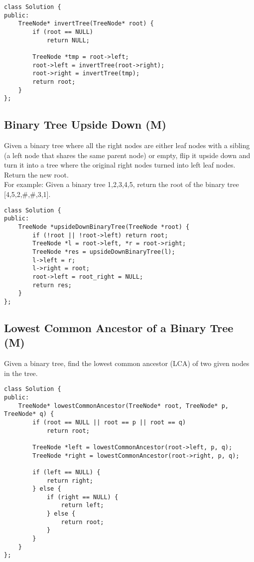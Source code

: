 \begin{lstlisting}
class Solution {
public:
    TreeNode* invertTree(TreeNode* root) {
        if (root == NULL)
            return NULL;
            
        TreeNode *tmp = root->left;
        root->left = invertTree(root->right);
        root->right = invertTree(tmp);
        return root;
    }
};
\end{lstlisting}


\subsection{Binary Tree Upside Down (M)}
Given a binary tree where all the right nodes are either leaf nodes with a sibling (a left node that shares the same parent node) or empty, flip it upside down and turn it into a tree where the original right nodes turned into left leaf nodes. Return the new root.\\

For example:
Given a binary tree {1,2,3,4,5}, return the root of the binary tree [4,5,2,\#,\#,3,1]. \\

\begin{lstlisting}
class Solution {
public:
    TreeNode *upsideDownBinaryTree(TreeNode *root) {
        if (!root || !root->left) return root;
        TreeNode *l = root->left, *r = root->right;
        TreeNode *res = upsideDownBinaryTree(l);
        l->left = r;
        l->right = root;
        root->left = root_right = NULL;
        return res;
    }
};
\end{lstlisting}


\subsection{Lowest Common Ancestor of a Binary Tree (M)}
Given a binary tree, find the lowest common ancestor (LCA) of two given nodes in the tree. \\

\begin{lstlisting}
class Solution {
public:
    TreeNode* lowestCommonAncestor(TreeNode* root, TreeNode* p, TreeNode* q) {
        if (root == NULL || root == p || root == q)
            return root;
        
        TreeNode *left = lowestCommonAncestor(root->left, p, q);
        TreeNode *right = lowestCommonAncestor(root->right, p, q);
        
        if (left == NULL) {
            return right;
        } else {
            if (right == NULL) {
                return left;
            } else {
                return root;
            }
        }
    }
};
\end{lstlisting}


